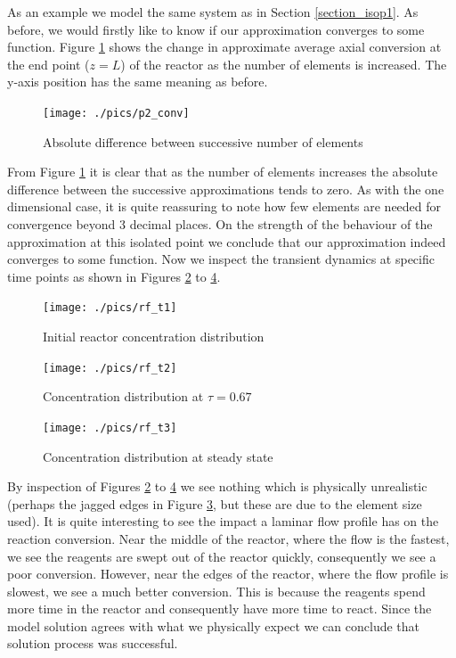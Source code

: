 \documentclass[11pt,fleqn]{article}
\theoremstyle{defstyle}
\begin{document}
As an example we model the same system as in Section \ref{section_isop1}. As before, we would firstly like to know if  our approximation converges to some function. Figure \ref{fig_p2conv} shows the change in approximate average axial conversion at the end point ($z=L$) of the reactor as the number of elements is increased. The y-axis position has the same meaning as before. 
\begin{figure}[H] 
\centering
\texttt{[image: ./pics/p2\_conv]}
\caption{Absolute difference between successive number of elements} 
\label{fig_p2conv}
\end{figure}
From Figure \ref{fig_p2conv} it is clear that as the number of elements increases the absolute difference between the successive approximations tends to zero. As with the one dimensional case, it is quite reassuring to note how few elements are needed for convergence beyond 3 decimal places. On the strength of the behaviour of the approximation at this isolated point we conclude that our approximation indeed converges to some function. Now we inspect the transient dynamics at specific time points as shown in Figures \ref{fig_rft1} to \ref{fig_rft3}.
\begin{figure}[H] 
\centering
\texttt{[image: ./pics/rf\_t1]}
\caption{Initial reactor concentration distribution} 
\label{fig_rft1}
\end{figure}
\begin{figure}[H] 
\centering
\texttt{[image: ./pics/rf\_t2]}
\caption{Concentration distribution at $\tau=0.67$} 
\label{fig_rft2}
\end{figure}
\begin{figure}[H] 
\centering
\texttt{[image: ./pics/rf\_t3]}
\caption{Concentration distribution at steady state} 
\label{fig_rft3}
\end{figure}
By inspection of Figures \ref{fig_rft1} to \ref{fig_rft3} we see nothing which is physically unrealistic (perhaps the jagged edges in Figure \ref{fig_rft2}, but these are due to the element size used). It is quite interesting to see the impact a laminar flow profile has on the reaction conversion. Near the middle of the reactor, where the flow is the fastest, we see the reagents are swept out of the reactor quickly, consequently we see a poor conversion. However, near the edges of the reactor, where the flow profile is slowest, we see a much better conversion. This is because the reagents spend more time in the reactor and consequently have more time to react. Since the model solution agrees with what we physically expect we can conclude that solution process was successful.
\end{document}
